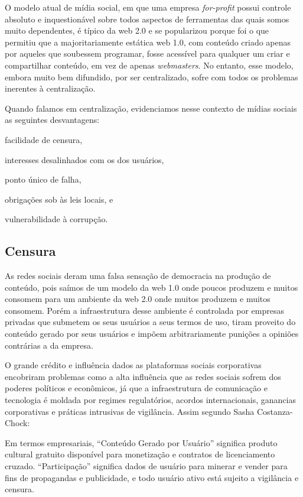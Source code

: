 O modelo atual de mídia social, em que uma empresa \textit{for-profit} possui controle absoluto e inquestionável sobre todos aspectos de ferramentas das quais somos muito dependentes, é típico da web 2.0 e se popularizou porque foi o que permitiu que a majoritariamente estática web 1.0, com conteúdo criado apenas por aqueles que soubessem programar, fosse acessível para qualquer um criar e compartilhar conteúdo, em vez de apenas \textit{webmasters}.
No entanto, esse modelo, embora muito bem difundido, por ser centralizado, sofre com todos os problemas inerentes à centralização.

Quando falamos em centralização, evidenciamos nesse contexto de mídias sociais as seguintes desvantagens:
\begin{enumerate*}[label=(\arabic*)]
    \item facilidade de censura,
    \item interesses desalinhados com os dos usuários,
    \item ponto único de falha,
    \item obrigações sob às leis locais, e
    \item vulnerabilidade à corrupção.
\end{enumerate*}

\subsection{Censura}
As redes sociais deram uma falsa sensação de democracia na produção de conteúdo, pois saímos de um modelo da web 1.0 onde poucos produzem e muitos consomem para um ambiente da web 2.0 onde muitos produzem e muitos consomem. Porém a infraestrutura desse ambiente é controlada por empresas privadas que submetem os seus usuários a seus termos de uso, tiram proveito do conteúdo gerado por seus usuários e impõem arbitrariamente punições a opiniões contrárias a da empresa.

O grande crédito e influência dados as plataformas sociais corporativas encobriram  problemas como a alta influência que as redes sociais sofrem dos poderes políticos e econômicos, já que a infraestrutura de comunicação e tecnologia é moldada por regimes regulatórios, acordos internacionais, ganancias corporativas e práticas intrusivas de vigilância. Assim segundo Sasha Costanza-Chock\cite{Censura1}:


\begin{directcite}
    Em termos empresariais, ``Conteúdo Gerado por Usuário'' significa produto cultural gratuito disponível para monetização e contratos de licenciamento cruzado. ``Participação'' significa dados de usuário para minerar e vender para fins de propagandas e publicidade, e todo usuário ativo está sujeito a vigilância e censura.
\end{directcite}


